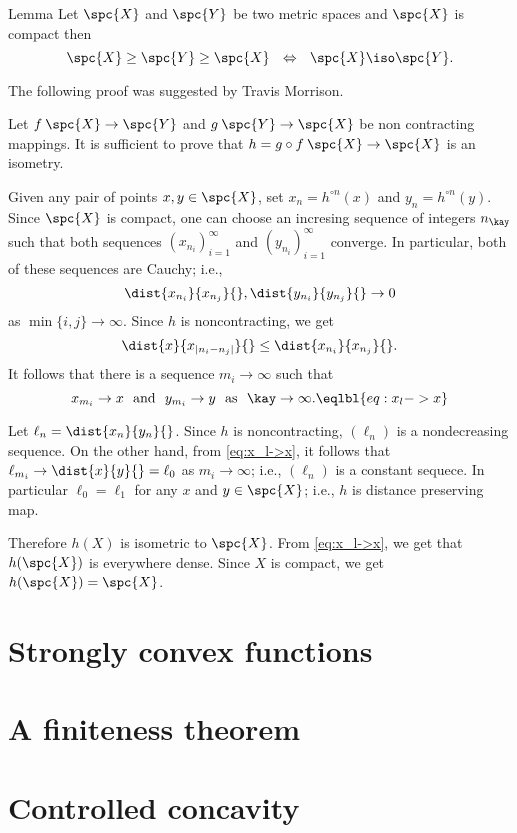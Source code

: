 \begin{thm}{Lemma}\label{lem:>=-isometry}
Let $\spc{X}$ and $\spc{Y}$ be two metric spaces 
and $\spc{X}$ is compact then
\[
\spc{X}\ge\spc{Y}\ge\spc{X}
\ \ \Leftrightarrow\ \ 
\spc{X}\iso\spc{Y}.
\]

\end{thm}

The following proof was suggested by Travis Morrison.

Let $f\: \spc{X} \to \spc{Y}$ 
and $g\: \spc{Y} \to \spc{X}$ be non contracting mappings.
It is sufficient to prove that $h  = g\circ f\:\spc{X}\to \spc{X}$ is an isometry. 

Given any pair of points $x,y\in \spc{X}$, 
set $x_n=h^{\circ n}(x)$ and $y_n=h^{\circ n}(y)$.
Since $\spc{X}$ is compact, one can choose an incresing sequence of integers $n_\kay$
such that both sequences $(x_{n_i})_{i=1}^\infty$ and $(y_{n_i})_{i=1}^\infty$
converge.
In particular, both of these sequences  are Cauchy;
i.e.,
\[
\dist{x_{n_i}}{x_{n_j}}{},\dist{y_{n_i}}{y_{n_j}}{}\to 0
\]
as $\min\{i,j\}\to\infty$.
Since $h$ is noncontracting, we get
\[
\dist{x}{x_{|n_i-n_j|}}{}\le \dist{x_{n_i}}{x_{n_j}}{}.
\]
It follows that  
there is a sequence $m_i\to\infty$ such that
\[
x_{m_i}\to x\ \ \text{and}\ \ y_{m_i}\to y\ \ \text{as}\ \ \kay\to\infty.
\eqlbl{eq:x_l->x}
\]

Let $\ell_n=\dist{x_n}{y_n}{}$.
Since $h$ is noncontracting, $(\ell_n)$ is a nondecreasing sequence.
On the other hand, 
from \ref{eq:x_l->x}, it follows that $\ell_{m_i}\to\dist{x}{y}{}=\ell_0$ as $m_i\to\infty$;
i.e., $(\ell_n)$ is a constant sequece.
In particular $\ell_0=\ell_1$ for any $x$ and $y\in \spc{X}$;
i.e., $h$ is distance preserving map.

Therefore $h(X)$ is isometric to $\spc{X}$.
From \ref{eq:x_l->x}, we get that $h(\spc{X})$ is everywhere dense.
Since $X$ is compact, we get $h(\spc{X})=\spc{X}$.
\qeds

\section{Strongly convex functions}

\section{A finiteness theorem}

\section{Controlled concavity}
\addtocounter{subsection}{1}
\setcounter{thm}{0}

